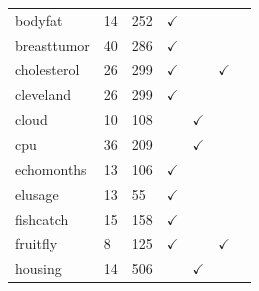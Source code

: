 \documentclass[12pt]{article}
\begin{document}
\begin{table}[!t]
\begin{tabular}{l|l|l|c|c|c|c}
bodyfat                                      & 14                                            & 252                                            &$\checkmark$       &            &        &            \\
breasttumor                                  & 40                                            & 286                                            &$\checkmark$       &            &        &            \\
cholesterol                                  & 26                                            & 299                                            &$\checkmark$       &            &$\checkmark$     &            \\
cleveland                                    & 26                                            & 299                                            &$\checkmark$       &            &        &            \\
cloud                                        & 10                                            & 108                                            &          &$\checkmark$         &        &            \\
cpu                                          & 36                                            & 209                                            &          &$\checkmark$         &        &            \\
echomonths                                   & 13                                            & 106                                            &$\checkmark$       &            &        &            \\
elusage                                      & 13                                            & 55                                             &$\checkmark$       &            &        &            \\
fishcatch                                    & 15                                            & 158                                            &$\checkmark$       &            &        &            \\
fruitfly                                     & 8                                             & 125                                            &$\checkmark$       &            &$\checkmark$     &            \\
housing                                      & 14                                            & 506                                            &          &$\checkmark$         &        &            \\

\end{tabular}
\end{table}
\end{document}

